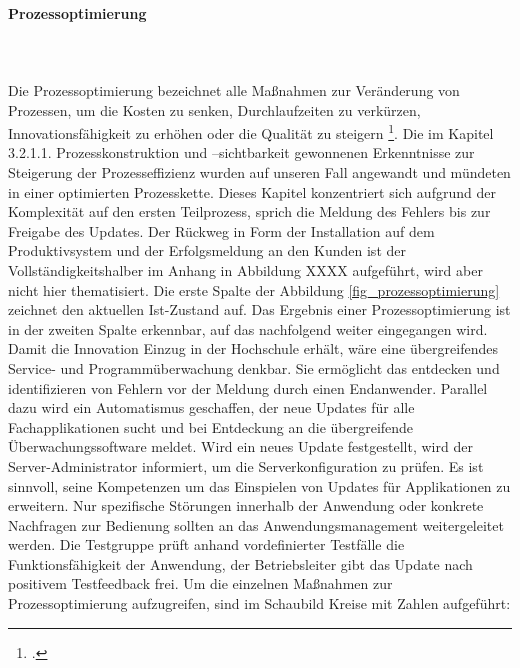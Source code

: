 \paragraph{Prozessoptimierung}\mbox{}\\\\
Die Prozessoptimierung bezeichnet alle Maßnahmen zur Veränderung von Prozessen, um die Kosten zu senken, Durchlaufzeiten zu verkürzen, Innovationsfähigkeit zu erhöhen oder die Qualität zu steigern \footcite{Zitat fehlt}. 
Die im Kapitel 3.2.1.1. Prozesskonstruktion und –sichtbarkeit gewonnenen Erkenntnisse zur Steigerung der Prozesseffizienz wurden auf unseren Fall angewandt und mündeten in einer optimierten Prozesskette. Dieses Kapitel konzentriert sich aufgrund der Komplexität auf den ersten Teilprozess, sprich die Meldung des Fehlers bis zur Freigabe des Updates. Der Rückweg in Form der Installation auf dem Produktivsystem und der Erfolgsmeldung an den Kunden ist der Vollständigkeitshalber im Anhang in Abbildung XXXX aufgeführt, wird aber nicht hier thematisiert. 
Die erste Spalte der Abbildung \ref{fig_prozessoptimierung} zeichnet den aktuellen Ist-Zustand auf. Das Ergebnis einer Prozessoptimierung ist in der zweiten Spalte erkennbar, auf das nachfolgend weiter eingegangen wird. Damit die Innovation Einzug in der Hochschule erhält, wäre eine übergreifendes Service- und Programmüberwachung denkbar. Sie ermöglicht das entdecken und identifizieren von Fehlern vor der Meldung durch einen Endanwender. Parallel dazu wird ein Automatismus geschaffen, der neue Updates für alle Fachapplikationen sucht und bei Entdeckung an die übergreifende Überwachungssoftware meldet. Wird ein neues Update festgestellt, wird der Server-Administrator informiert, um die Serverkonfiguration zu prüfen. Es ist sinnvoll, seine Kompetenzen um das Einspielen von Updates für Applikationen zu erweitern. Nur spezifische Störungen innerhalb der Anwendung oder konkrete Nachfragen zur Bedienung sollten an das Anwendungsmanagement weitergeleitet werden.  Die Testgruppe prüft anhand vordefinierter Testfälle die Funktionsfähigkeit der Anwendung, der Betriebsleiter gibt das Update nach positivem Testfeedback frei.
Um die einzelnen Maßnahmen zur Prozessoptimierung aufzugreifen, sind im Schaubild Kreise mit Zahlen aufgeführt:

